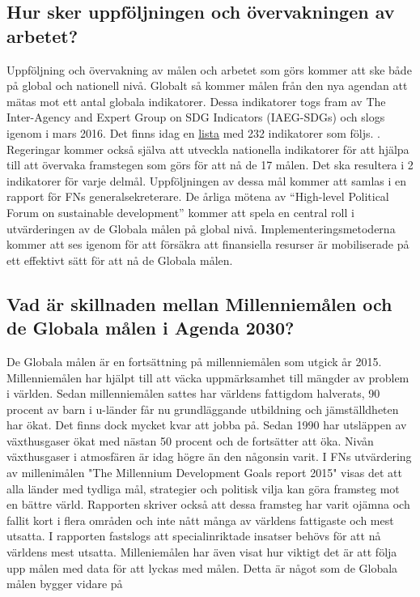 \documentclass{report}
\begin{document}
\subsection{Hur sker uppföljningen och övervakningen av arbetet?} 
Uppföljning och övervakning av målen och arbetet som görs kommer att ske både på global och nationell nivå. Globalt så kommer målen från den nya agendan att mätas mot ett antal globala indikatorer. Dessa indikatorer togs fram av The Inter-Agency and Expert Group on SDG Indicators (IAEG-SDGs) och slogs igenom i mars 2016. \cite{web2030agenda}
Det finns idag en \href{https://unstats.un.org/sdgs/indicators/indicators-list/}{lista} med 232 indikatorer som följs. \cite{webUN2}.
Regeringar kommer också själva att utveckla nationella indikatorer för att hjälpa till att övervaka framstegen som görs för att nå de 17 målen. Det ska resultera i 2 indikatorer för varje delmål. Uppföljningen av dessa mål kommer att samlas i en rapport för FNs generalsekreterare. De årliga mötena av  “High-level Political Forum on sustainable development” kommer att spela en central roll i utvärderingen av de Globala målen på global nivå. Implementeringsmetoderna kommer att ses igenom för att försäkra att finansiella resurser är mobiliserade på ett effektivt sätt för att nå de Globala målen.  \cite{web2030agenda}\\

\subsection{Vad är skillnaden mellan Millenniemålen och de Globala målen i Agenda 2030?} 
De Globala målen är en fortsättning på millenniemålen som utgick år 2015. Millenniemålen har hjälpt till att väcka uppmärksamhet till mängder av problem i världen. Sedan millenniemålen sattes har världens fattigdom halverats, 90 procent av barn i u-länder får nu grundläggande utbildning och jämställdheten har ökat. Det finns dock mycket kvar att jobba på. \cite{webEuropeanComission}
Sedan 1990 har utsläppen av växthusgaser ökat med nästan 50 procent och de fortsätter att öka. Nivån växthusgaser i atmosfären är idag högre än den någonsin varit. \cite{UN1}
I FNs utvärdering av millenimålen "The Millennium Development Goals report 2015"  \cite{Millennium} visas det att alla länder med tydliga mål, strategier och politisk vilja kan göra framsteg mot en bättre värld. Rapporten skriver också att dessa framsteg har varit ojämna och fallit kort i flera områden och inte nått många av världens fattigaste och mest utsatta. I rapporten fastslogs att specialinriktade insatser behövs för att nå världens mest utsatta.  Milleniemålen har även visat hur viktigt det är att följa upp målen med data för att lyckas med målen. Detta är något som de Globala målen bygger vidare på \cite{Millennium}\\
\end{document}
